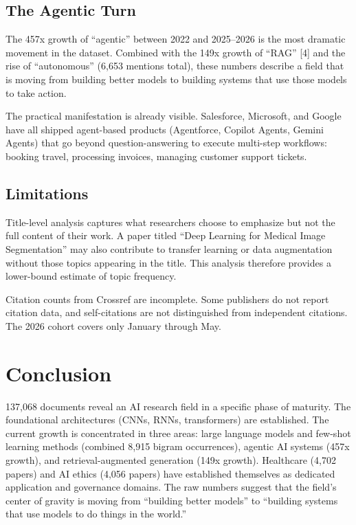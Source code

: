 \documentclass[11pt]{article}
\begin{document}
\subsection{The Agentic Turn}

The 457x growth of ``agentic'' between 2022 and 2025--2026 is the most dramatic movement in the dataset. Combined with the 149x growth of ``RAG'' [4] and the rise of ``autonomous'' (6,653 mentions total), these numbers describe a field that is moving from building better models to building systems that use those models to take action.

The practical manifestation is already visible. Salesforce, Microsoft, and Google have all shipped agent-based products (Agentforce, Copilot Agents, Gemini Agents) that go beyond question-answering to execute multi-step workflows: booking travel, processing invoices, managing customer support tickets.

\subsection{Limitations}

Title-level analysis captures what researchers choose to emphasize but not the full content of their work. A paper titled ``Deep Learning for Medical Image Segmentation'' may also contribute to transfer learning or data augmentation without those topics appearing in the title. This analysis therefore provides a lower-bound estimate of topic frequency.

Citation counts from Crossref are incomplete. Some publishers do not report citation data, and self-citations are not distinguished from independent citations. The 2026 cohort covers only January through May.

\section{Conclusion}
\label{sec:conclusion}

137,068 documents reveal an AI research field in a specific phase of maturity. The foundational architectures (CNNs, RNNs, transformers) are established. The current growth is concentrated in three areas: large language models and few-shot learning methods (combined 8,915 bigram occurrences), agentic AI systems (457x growth), and retrieval-augmented generation (149x growth). Healthcare (4,702 papers) and AI ethics (4,056 papers) have established themselves as dedicated application and governance domains. The raw numbers suggest that the field's center of gravity is moving from ``building better models'' to ``building systems that use models to do things in the world.''
\end{document}
